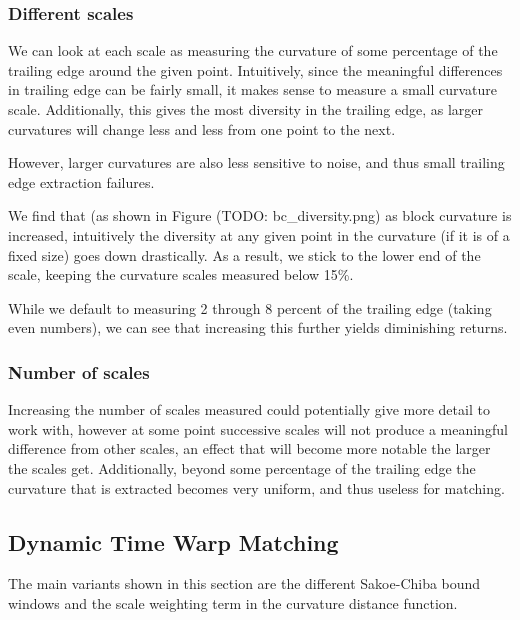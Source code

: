 \subsubsection{Different scales}

We can look at each scale as measuring the curvature of some percentage of the trailing edge around the given point.
Intuitively, since the meaningful differences in trailing edge can be fairly small, it makes sense to measure a small curvature scale.
Additionally, this gives the most diversity in the trailing edge, as larger curvatures will change less and less from one point to the next.

However, larger curvatures are also less sensitive to noise, and thus small trailing edge extraction failures.

We find that (as shown in Figure (TODO: bc\_diversity.png) as block curvature is increased, intuitively the diversity at any given point in the curvature (if it is of a fixed size) goes down drastically. As a result, we stick to the lower end of the scale, keeping the curvature scales measured below 15\%.

While we default to measuring 2 through 8 percent of the trailing edge (taking even numbers), we can see that increasing this further yields diminishing returns. %

\subsubsection{Number of scales}

Increasing the number of scales measured could potentially give more detail to work with, however at some point successive scales will not produce a meaningful difference from other scales, an effect that will become more notable the larger the scales get. %
Additionally, beyond some percentage of the trailing edge the curvature that is extracted becomes very uniform, and thus useless for matching. %

\subsection{Dynamic Time Warp Matching}

The main variants shown in this section are the different Sakoe-Chiba bound windows and the scale weighting term in the curvature distance function.

